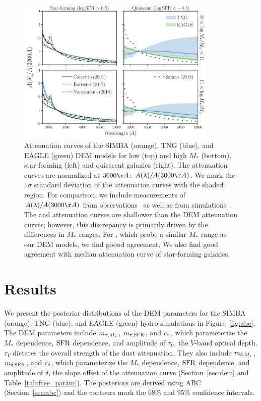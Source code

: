 \begin{figure}
\begin{center}
    \includegraphics[width=0.85\textwidth]{figs/abc_attenuation.pdf}
    \caption{\label{fig:atten}
    Attenuation curves of the SIMBA (orange), TNG (blue), and EAGLE (green) DEM
    models for low (top) and high $M_*$ (bottom), star-forming (left) and
    quiescent galaxies (right). The attenuation curves are normalized at
    $3000\AA$: $A(\lambda)/A(3000\AA)$. We mark the $1\sigma$ standard
    deviation of the attenuation curves with the shaded region. For comparison,
    we include measurements of $A(\lambda)/A(3000\AA)$ from 
    observations~\citep{caleztti2000, battisti2017, salim2018} as well as
    from simulations~\cite{narayanan2018}. The \cite{calzetti2000} and
    \cite{battisti2017} attenuation curves are shallower than the DEM
    attenuation curves; however, this discrepancy is primarily driven by the
    differences in $M_*$ ranges. For \cite{salim2018}, which probe a similar
    $M_*$ range as our DEM models, we find goood agreement. We also find good agreement with
    median attenuation curve of \cite{narayanan2018} star-forming galaxies. 
    }
\end{center}
\end{figure}

\section{Results} \label{sec:results}
We present the posterior distributions of the DEM parameters for the SIMBA
(orange), TNG (blue), and EAGLE (green) hydro simulations in
Figure~\ref{fig:abc}. The DEM parameters include $m_{\tau,M_*}$, $m_{\tau,{\rm SFR}}$, and
$c_\tau$, which parameterize the $M_*$ dependence, ${\rm SFR}$ dependence, and 
amplitude of $\tau_V$, the $V$-band optical depth. $\tau_V$ dictates the
overall strength of the dust attenuation. They also include $m_{\delta,M_*}$,
$m_{\delta,{\rm SFR}}$, and $c_\delta$, which parameterize the $M_*$ dependence, ${\rm SFR}$ dependence,
and amplitude of $\delta$, the slope offset of the attenuation curve
(Section~\ref{sec:dem} and Table~\ref{tab:free_param}). The posteriors 
are derived using ABC (Section~\ref{sec:abc}) and the contours mark the 
$68\%$ and $95\%$ confidence intervals. 


